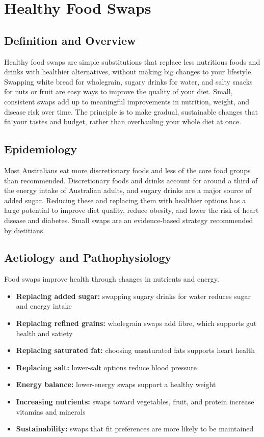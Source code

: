 \chapter{Healthy Food Swaps}

\section*{Definition and Overview}
Healthy food swaps are simple substitutions that replace less nutritious foods and drinks with healthier alternatives, without making big changes to your lifestyle. Swapping white bread for wholegrain, sugary drinks for water, and salty snacks for nuts or fruit are easy ways to improve the quality of your diet. Small, consistent swaps add up to meaningful improvements in nutrition, weight, and disease risk over time. The principle is to make gradual, sustainable changes that fit your tastes and budget, rather than overhauling your whole diet at once.

\section*{Epidemiology}
Most Australians eat more discretionary foods and less of the core food groups than recommended. Discretionary foods and drinks account for around a third of the energy intake of Australian adults, and sugary drinks are a major source of added sugar. Reducing these and replacing them with healthier options has a large potential to improve diet quality, reduce obesity, and lower the risk of heart disease and diabetes. Small swaps are an evidence-based strategy recommended by dietitians.

\section*{Aetiology and Pathophysiology}
Food swaps improve health through changes in nutrients and energy.

\begin{itemize}
    \item \textbf{Replacing added sugar:} swapping sugary drinks for water reduces sugar and energy intake
    \item \textbf{Replacing refined grains:} wholegrain swaps add fibre, which supports gut health and satiety
    \item \textbf{Replacing saturated fat:} choosing unsaturated fats supports heart health
    \item \textbf{Replacing salt:} lower-salt options reduce blood pressure
    \item \textbf{Energy balance:} lower-energy swaps support a healthy weight
    \item \textbf{Increasing nutrients:} swaps toward vegetables, fruit, and protein increase vitamins and minerals
    \item \textbf{Sustainability:} swaps that fit preferences are more likely to be maintained
\end{itemize}

